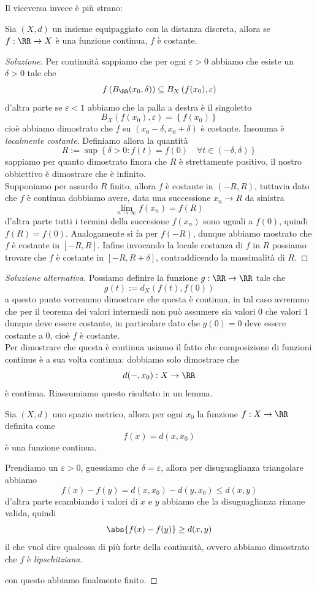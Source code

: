 \documentclass[11pt]{scrartcl}
\begin{document}
	Il viceversa invece è più strano:
	\begin{problem}
		Sia $(X,d)$ un insieme equipaggiato con la distanza discreta, allora se $f:\RR\to X$ è una funzione continua, $f$ è costante.
	\end{problem}
	\begin{proof}[Soluzione]
		Per continuità sappiamo che per ogni $\varepsilon>0$ abbiamo che esiste un $\delta>0$ tale che
		$$f\left(B_\RR(x_0,\delta)\right)\subseteq B_X\left(f(x_0),\varepsilon\right)$$
		d'altra parte se $\varepsilon<1 $ abbiamo che la palla a destra è il singoletto 
		$$ B_X\left(f(x_0),\varepsilon\right)=\left\{f(x_0)\right\}$$
		cioè abbiamo dimostrato che $f$ su $(x_0-\delta,x_0+\delta)$ è costante. Insomma è \textit{localmente costante}. Definiamo allora la quantità
		$$R:=\sup\left\{\delta>0:f(t)=f(0) \quad \forall t\in (-\delta,\delta)\right\}$$
		sappiamo per quanto dimostrato finora che $R$ è strettamente positivo, il nostro obbiettivo è dimostrare che è infinito. \\
		Supponiamo per assurdo $R$ finito, allora $f$ è costante in $(-R,R)$, tuttavia dato che $f$ è continua dobbiamo avere, data una successione $x_n\to R$ da sinistra
		$$\lim_{n\to\infty}f(x_n)=f(R)$$
		d'altra parte tutti i termini della succesione $f(x_n)$ sono uguali a $f(0)$, quindi $f(R)=f(0)$. Analogamente si fa per $f(-R)$, dunque abbiamo mostrato che $f$ è costante in $[-R,R]$. Infine invocando la locale costanza di $f$ in $R$ possiamo trovare che $f$ è costante in $[-R,R+\delta]$, contraddicendo la massimalità di $R$.
	\end{proof}
	\begin{proof}[Soluzione alternativa]
		Possiamo definire la funzione $g:\RR\to\RR$ tale che
		$$g(t):=d_X\left(f(t),f(0)\right)$$
		a questo punto vorremmo dimostrare che questa è continua, in tal caso avremmo che per il teorema dei valori intermedi non può assumere sia valori $0$ che valori $1$ dunque deve essere costante, in particolare dato che $g(0)=0$ deve essere costante a $0$, cioè $f$ è costante. \\
		Per dimostrare che questa è continua usiamo il fatto che composizione di funzioni continue è a sua volta continua: dobbiamo solo dimostrare che
		$$d(-,x_0):X\to \RR$$
		è continua. Riassumiamo questo risultato in un lemma.
		\begin{lemma}
			Sia $(X,d)$ uno spazio metrico, allora per ogni $x_0$ la funzione $f:X\to \RR$ definita come
			$$f(x)=d(x,x_0)$$
			è una funzione continua.
		\end{lemma}
		\begin{subproof}
			Prendiamo un $\varepsilon>0$, guessiamo che $\delta=\varepsilon$, allora per disuguaglianza triangolare abbiamo
			$$f(x)-f(y)=d(x,x_0)-d(y,x_0)\le d(x,y)$$
			d'altra parte scambiando i valori di $x$ e $y$ abbiamo che la disuguaglianza rimane valida, quindi
			$$\abs{f(x)-f(y)}\ge d(x,y)$$
			il che vuol dire qualcosa di più forte della continuità, ovvero abbiamo dimostrato che $f$ è \textit{lipschitziana}.
		\end{subproof}
		con questo abbiamo finalmente finito.
	\end{proof}
	
\end{document}
